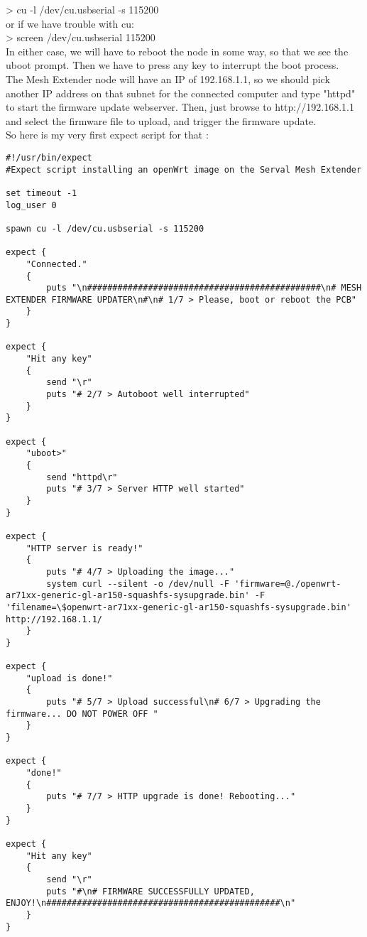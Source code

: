 > cu -l /dev/cu.usbserial -s 115200\\

or if we have trouble with cu: \\ 

> screen /dev/cu.usbserial 115200 \\

In either case, we will have to reboot the node in some way, so that we see the uboot prompt. Then we have to press any key to interrupt the boot process.\\
The Mesh Extender node will have an IP of 192.168.1.1, so we should pick another IP address on that subnet for the connected computer and type "httpd" to start the firmware update webserver. Then, just browse to http://192.168.1.1 and select the firmware file to upload, and trigger the firmware update. \\

So here is my very first expect script for that : \\
\begin{lstlisting}
#!/usr/bin/expect
#Expect script installing an openWrt image on the Serval Mesh Extender

set timeout -1
log_user 0

spawn cu -l /dev/cu.usbserial -s 115200

expect {
	"Connected." 
	{
	 	puts "\n##############################################\n# MESH EXTENDER FIRMWARE UPDATER\n#\n# 1/7 > Please, boot or reboot the PCB" 
	}
}

expect {
	"Hit any key" 
	{ 
		send "\r" 
		puts "# 2/7 > Autoboot well interrupted" 
	}
}

expect {
	"uboot>" 
	{ 
		send "httpd\r" 
		puts "# 3/7 > Server HTTP well started" 
	}
}

expect {
	"HTTP server is ready!"
	{ 
		puts "# 4/7 > Uploading the image..." 
		system curl --silent -o /dev/null -F 'firmware=@./openwrt-ar71xx-generic-gl-ar150-squashfs-sysupgrade.bin' -F 'filename=\$openwrt-ar71xx-generic-gl-ar150-squashfs-sysupgrade.bin' http://192.168.1.1/ 
	}
}

expect {
	"upload is done!"
	{ 
		puts "# 5/7 > Upload successful\n# 6/7 > Upgrading the firmware... DO NOT POWER OFF " 
	}
}

expect {
	"done!"
	{ 
		puts "# 7/7 > HTTP upgrade is done! Rebooting..." 
	}
}

expect {
	"Hit any key" 
	{ 
		send "\r" 
		puts "#\n# FIRMWARE SUCCESSFULLY UPDATED, ENJOY!\n##############################################\n" 
	}
}
\end{lstlisting} 

